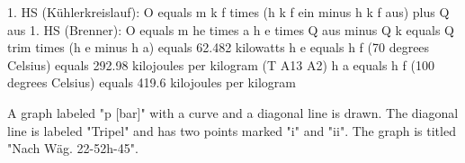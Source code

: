 1. HS (Kühlerkreislauf): O equals m k f times (h k f ein minus h k f aus) plus Q aus
1. HS (Brenner): O equals m he times a h e times Q aus minus Q k equals Q trim times (h e minus h a) equals 62.482 kilowatts
h e equals h f (70 degrees Celsius) equals 292.98 kilojoules per kilogram (T A13 A2)
h a equals h f (100 degrees Celsius) equals 419.6 kilojoules per kilogram

A graph labeled "p [bar]" with a curve and a diagonal line is drawn. The diagonal line is labeled "Tripel" and has two points marked "i" and "ii". The graph is titled "Nach Wäg. 22-52h-45".